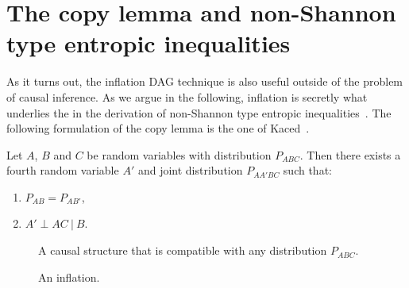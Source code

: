 \section{The copy lemma and non-Shannon type entropic inequalities}

As it turns out, the inflation DAG technique is also useful outside of the problem of causal inference. As we argue in the following, inflation is secretly what underlies the  in the derivation of non-Shannon type entropic inequalities~\cite[Chapter~15]{yeung_network_2008}. The following formulation of the copy lemma is the one of Kaced~\cite{kaced_equivalence_2013}.

\begin{lemma}
	Let $A$, $B$ and $C$ be random variables with distribution $P_{ABC}$. Then there exists a fourth random variable $A'$ and joint distribution $P_{AA'BC}$ such that:
	\begin{enumerate}
		\item $P_{AB} = P_{AB'}$,
		\item $A' \perp AC \:|\: B$.
	\label{copylemma}
	\end{enumerate}
\end{lemma}

\begin{figure}[t]
\centering
\begin{minipage}[b]{0.23\linewidth}
\centering
\caption{A causal structure that is compatible with any distribution $P_{ABC}$.}\label{fig:beforecopy}
\end{minipage}
\hfill
\begin{minipage}[t]{0.38\linewidth}
\centering
\caption{An inflation.}\label{fig:aftercopy}
\end{minipage}
\end{figure}

